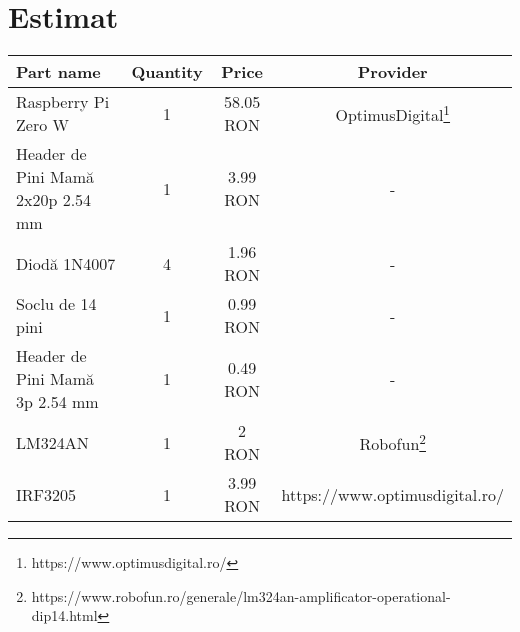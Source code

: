 \section {Estimat}
\begin{minipage}{\textwidth}
  \centering
  \begin{tabular}{ lccc } 
    \midrule
    Part name & Quantity & Price & Provider \\
    \midrule
    \midrule
    Raspberry Pi Zero W & 1 & 58.05 RON & OptimusDigital\footnote{https://www.optimusdigital.ro/} \\

    Header de Pini Mamă 2x20p 2.54 mm & 1 & 3.99 RON & -\\ 

    Diodă 1N4007 & 4 & 1.96 RON & -\\ 

    Soclu de 14 pini & 1 & 0.99 RON & -\\ 

    Header de Pini Mamă 3p 2.54 mm & 1 & 0.49 RON & -\\ 

    LM324AN & 1 & 2 RON & Robofun\footnote{https://www.robofun.ro/generale/lm324an-amplificator-operational-dip14.html}\\ 

    IRF3205 & 1 & 3.99 RON & https://www.optimusdigital.ro/\\ 
    \midrule
  \end{tabular}
\end{minipage}
